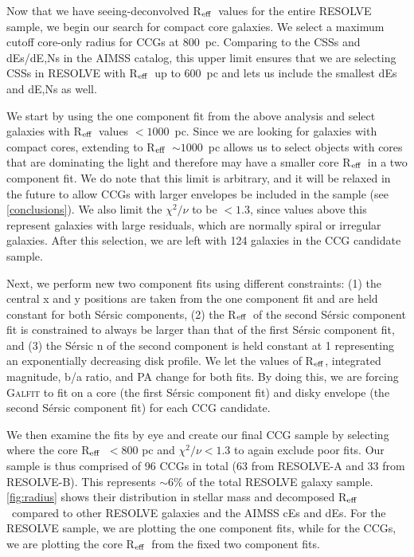 \documentclass[iop,apj]{emulateapj}
\newcommand{\Reff}{R$_{\rm eff}$}
\begin{document}
Now that we have seeing-deconvolved \Reff\ values for the entire RESOLVE sample, we begin our search for compact core galaxies. We select a maximum cutoff core-only radius for CCGs at 800~pc. Comparing to the CSSs and dEs/dE,Ns in the AIMSS catalog, this upper limit ensures that we are selecting CSSs in RESOLVE with \Reff\ up to 600~pc and lets us include the smallest dEs and dE,Ns as well.

We start by using the one component fit from the above analysis and select galaxies with \Reff\ values $<1000$~pc. Since we are looking for galaxies with compact cores, extending to \Reff\ $\sim 1000$~pc allows us to select objects with cores that are dominating the light and therefore may have a smaller core \Reff\ in a two component fit. We do note that this limit is arbitrary, and it  will be relaxed in the future to allow CCGs with larger envelopes be included in the sample (see \autoref{conclusions}). We also limit the  $\chi^2/\nu$ to be $<1.3$, since values above this represent galaxies with large residuals, which are normally spiral or irregular galaxies. After this selection, we are left with 124 galaxies in the CCG candidate sample.

Next, we perform new two component fits using different constraints: (1) the central x and y positions are taken from the one component fit and are held constant for both S\'ersic components, (2) the \Reff\ of the second S\'ersic component fit is constrained to always be larger than that of the first S\'ersic component fit, and (3) the S\'ersic n of the second component is held constant at 1 representing an exponentially decreasing disk profile. We let the values of \Reff, integrated magnitude, b/a ratio, and PA change for both fits. By doing this, we are forcing \textsc{Galfit} to fit on a core (the first S\'ersic component fit) and disky envelope (the second S\'ersic component fit) for each CCG candidate.

We then examine the fits by eye and create our final CCG sample by selecting where the core \Reff\ $< 800$ pc and $\chi^2/\nu < 1.3$ to again exclude poor fits. Our sample is thus comprised of 96 CCGs in total (63 from RESOLVE-A and 33 from RESOLVE-B). This represents $\sim6$\% of the total RESOLVE galaxy sample. \autoref{fig:radius} shows their distribution in stellar mass and decomposed \Reff\ compared to other RESOLVE galaxies and the AIMSS cEs and dEs. For the RESOLVE sample, we are plotting the one component fits, while for the CCGs, we are plotting the core \Reff\ from the fixed two component fits. 
\end{document}
